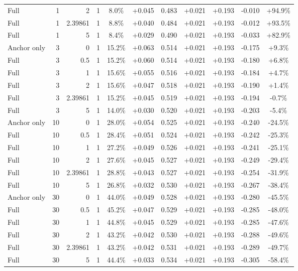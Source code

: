 \begin{table}[htbp]
\begin{tabular}{lrrrccccccc}
Full & 1 & 2 & 1 & 8.0\% & +0.045 & 0.483 & +0.021 & +0.193 & -0.010 & +94.9\% \\
Full & 1 & 2.39861 & 1 & 8.8\% & +0.040 & 0.484 & +0.021 & +0.193 & -0.012 & +93.5\% \\
Full & 1 & 5 & 1 & 8.4\% & +0.029 & 0.490 & +0.021 & +0.193 & -0.033 & +82.9\% \\
Anchor only & 3 & 0 & 1 & 15.2\% & +0.063 & 0.514 & +0.021 & +0.193 & -0.175 & +9.3\% \\
Full & 3 & 0.5 & 1 & 15.2\% & +0.060 & 0.514 & +0.021 & +0.193 & -0.180 & +6.8\% \\
Full & 3 & 1 & 1 & 15.6\% & +0.055 & 0.516 & +0.021 & +0.193 & -0.184 & +4.7\% \\
Full & 3 & 2 & 1 & 15.6\% & +0.047 & 0.518 & +0.021 & +0.193 & -0.190 & +1.4\% \\
Full & 3 & 2.39861 & 1 & 15.2\% & +0.045 & 0.519 & +0.021 & +0.193 & -0.194 & -0.7\% \\
Full & 3 & 5 & 1 & 14.0\% & +0.030 & 0.520 & +0.021 & +0.193 & -0.203 & -5.4\% \\
Anchor only & 10 & 0 & 1 & 28.0\% & +0.054 & 0.525 & +0.021 & +0.193 & -0.240 & -24.5\% \\
Full & 10 & 0.5 & 1 & 28.4\% & +0.051 & 0.524 & +0.021 & +0.193 & -0.242 & -25.3\% \\
Full & 10 & 1 & 1 & 27.2\% & +0.049 & 0.526 & +0.021 & +0.193 & -0.241 & -25.1\% \\
Full & 10 & 2 & 1 & 27.6\% & +0.045 & 0.527 & +0.021 & +0.193 & -0.249 & -29.4\% \\
Full & 10 & 2.39861 & 1 & 28.8\% & +0.043 & 0.527 & +0.021 & +0.193 & -0.254 & -31.9\% \\
Full & 10 & 5 & 1 & 26.8\% & +0.032 & 0.530 & +0.021 & +0.193 & -0.267 & -38.4\% \\
Anchor only & 30 & 0 & 1 & 44.0\% & +0.049 & 0.528 & +0.021 & +0.193 & -0.280 & -45.5\% \\
Full & 30 & 0.5 & 1 & 45.2\% & +0.047 & 0.529 & +0.021 & +0.193 & -0.285 & -48.0\% \\
Full & 30 & 1 & 1 & 44.8\% & +0.045 & 0.529 & +0.021 & +0.193 & -0.285 & -47.6\% \\
Full & 30 & 2 & 1 & 43.2\% & +0.042 & 0.530 & +0.021 & +0.193 & -0.288 & -49.6\% \\
Full & 30 & 2.39861 & 1 & 43.2\% & +0.042 & 0.531 & +0.021 & +0.193 & -0.289 & -49.7\% \\
Full & 30 & 5 & 1 & 44.4\% & +0.033 & 0.534 & +0.021 & +0.193 & -0.305 & -58.4\% \\

\end{tabular}
\end{table}
